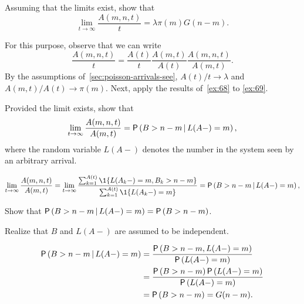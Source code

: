 \begin{exercise}\label{ex:70}
Assuming that the limits exist, show that
\begin{equation*}
\lim_{t\to\infty}   \frac{A(m,n,t)}t = \lambda \pi(m) G(n-m).
\end{equation*}
\begin{solution}
For this purpose, observe that we can write
\begin{equation}\label{eq:16}
  \frac{A(m,n,t)}t =   \frac{A(t)}t \frac{A(m,t)}{A(t)}\frac{A(m,n,t)}{A(m,t)}.
\end{equation}
By the assumptions of~\cref{sec:poisson-arrivals-see}, $A(t)/t\to\lambda$ and $A(m,t)/A(t)\to\pi(m)$.
Next, apply the results of~\cref{ex:68} to \cref{ex:69}.
\end{solution}
\end{exercise}

\begin{extra}\label{ex:68}
Provided the limit exists, show that
\begin{equation}\label{eq:1332}
\lim_{t\to\infty} \frac{A(m,n,t)}{A(m,t)} =\P{B>n-m\given L(A-)=m},
\end{equation}
where the random variable $L(A-)$ denotes the number in the system seen by an arbitrary arrival.
\begin{solution}
\begin{equation*}
\lim_{t\to\infty} \frac{A(m,n,t)}{A(m,t)} = 
\lim_{t\to\infty} \frac{\sum_{k=1}^{A(t)}\1{L(A_k-) = m, B_k > n-m}}
{\sum_{k=1}^{A(t)}\1{L(A_k-) = m}}=\P{B>n-m\given L(A-)=m},
\end{equation*}
\end{solution}
\end{extra}


\begin{extra}\label{ex:69}
Show that $\P{B>n-m\given L(A-)=m}=\P{B>n-m}$.
  \begin{hint}
    Realize that $B$ and $L(A-)$ are assumed to be independent.
  \end{hint}
\begin{solution}
\begin{equation*}
  \begin{split}
\P{B>n-m\given L(A-)=m} &=
\frac{\P{B>n-m,L(A-)=m}}{\P{L(A-)=m}}\\
&=\frac{\P{B>n-m}\P{L(A-)=m}}{\P{L(A-)=m}} \\
&= \P{B>n-m} =G(n-m).
  \end{split}
\end{equation*}
\end{solution}
\end{extra}

